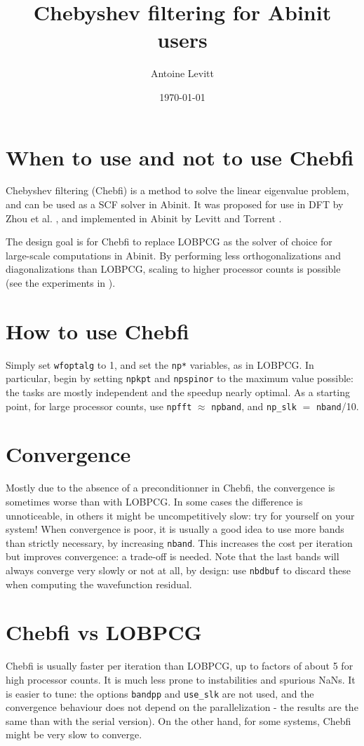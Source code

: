 \documentclass[11pt]{article}
\title{Chebyshev filtering for Abinit users}
\author{Antoine Levitt}
\date{\today}
\begin{document}
\maketitle
\tableofcontents
\section{When to use and not to use Chebfi}
Chebyshev filtering (Chebfi) is a method to solve the linear
eigenvalue problem, and can be used as a SCF solver in Abinit. It was
proposed for use in DFT by Zhou et al. \cite{zhou2006self}, and
implemented in Abinit by Levitt and Torrent \cite{levitt2014parallel}.

The design goal is for Chebfi to replace LOBPCG as the solver of
choice for large-scale computations in Abinit. By performing less
orthogonalizations and diagonalizations than LOBPCG, scaling to higher
processor counts is possible (see the experiments in
\cite{levitt2014parallel}).

\section{How to use Chebfi}
Simply set \texttt{wfoptalg} to 1, and set the \texttt{np*} variables,
as in LOBPCG. In particular, begin by setting \texttt{npkpt} and
\texttt{npspinor} to the maximum value possible: the tasks are mostly
independent and the speedup nearly optimal. As a starting point, for
large processor counts, use \texttt{npfft} $\approx$ \texttt{npband},
and \texttt{np\_slk} $=$ \texttt{nband}/10.
\section{Convergence}
Mostly due to the absence of a preconditionner in Chebfi, the
convergence is sometimes worse than with LOBPCG. In some cases the
difference is unnoticeable, in others it might be uncompetitively
slow: try for yourself on your system! When convergence is poor, it is
usually a good idea to use more bands than strictly necessary, by
increasing \texttt{nband}. This increases the cost per iteration but
improves convergence: a trade-off is needed. Note that the last bands
will always converge very slowly or not at all, by design: use
\texttt{nbdbuf} to discard these when computing the wavefunction
residual.
\section{Chebfi vs LOBPCG}
Chebfi is usually faster per iteration than LOBPCG, up to factors of
about 5 for high processor counts. It is much less prone to
instabilities and spurious NaNs. It is easier to tune: the options
\texttt{bandpp} and \texttt{use\_slk} are not used, and the
convergence behaviour does not depend on the parallelization - the
results are the same than with the serial version). On the other hand,
for some systems, Chebfi might be very slow to converge.
\end{document}
